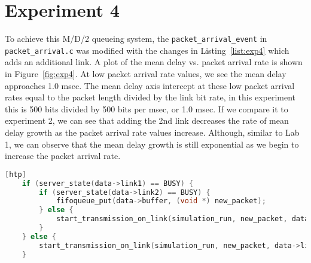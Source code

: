 \section*{Experiment 4}

To achieve this M/D/2 queueing system, the \texttt{packet\_arrival\_event} in \texttt{packet\_arrival.c} was modified with the changes in Listing~\ref{list:exp4} which adds an additional link. A plot of the mean delay vs. packet arrival rate is shown in Figure~\ref{fig:exp4}. At low packet arrival rate values, we see the mean delay approaches 1.0 msec. The mean delay axis intercept at these low packet arrival rates equal to the packet length divided by the link bit rate, in this experiment this is 500 bits divided by 500 bits per msec, or 1.0 msec. If we compare it to experiment 2, we can see that adding the 2nd link decreases the rate of mean delay growth as the packet arrival rate values increase. Although, similar to Lab 1, we can observe that the mean delay growth is still exponential as we begin to increase the packet arrival rate.

\begin{lstlisting}[language=C, caption={Modifications to Experiment 4 Code}, label={list:exp4}][htp]
    if (server_state(data->link1) == BUSY) {
        if (server_state(data->link2) == BUSY) {
            fifoqueue_put(data->buffer, (void *) new_packet);
        } else {
            start_transmission_on_link(simulation_run, new_packet, data->link2);
        }
    } else {
        start_transmission_on_link(simulation_run, new_packet, data->link1);
    }
\end{lstlisting}


